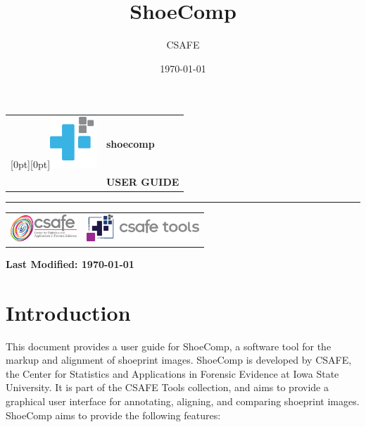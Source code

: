 \documentclass{csafedoc}
\begin{document}
\title{ShoeComp}
\author{CSAFE}
\date{\today}

\begin{titlingpage}
	\begin{vplace}
		\vfill{}
		\begin{center}
			\begin{tabular}{cl}
				\raisebox{-.35\height}[0pt][0pt]{\includegraphics[height=55pt]{images/shoecomp-logo.png}} & {\fontsize{40}{35}\selectfont\bfseries\textcolor{pantone654c}{shoecomp}} \\
					 & {\fontsize{21}{21}\selectfont\bfseries\textcolor{pantone637c}{USER GUIDE}}
			\end{tabular}
			\par
			\vspace*{25pt}
			\textcolor{pantone654c}{\rule{0.85\textwidth}{2pt}}
			\par
			\vspace*{20pt}
			\begin{tabular}{c!{\color{pantone425c}\vrule}c}
				\includegraphics[height=1cm,keepaspectratio]{images/csafe-logo.png} &
            \includegraphics[height=1cm,keepaspectratio]{images/csafe-tools-logo.png}
		    \end{tabular}
		\end{center}
		\vfill{}
	\end{vplace}
		\hfill{}
		\textbf{\textcolor{pantone654c}{Last Modified: \today}}
\end{titlingpage}
\newpage

\chapter{Introduction}%
\label{sec:intro}

This document provides a user guide for ShoeComp, a software tool for the markup and
alignment of shoeprint images. ShoeComp is developed by CSAFE, the Center for Statistics
and Applications in Forensic Evidence at Iowa State University. It is part of the CSAFE
Tools collection, and aims to provide a graphical user interface for annotating, aligning,
and comparing shoeprint images. ShoeComp aims to provide the following features:
\end{document}
